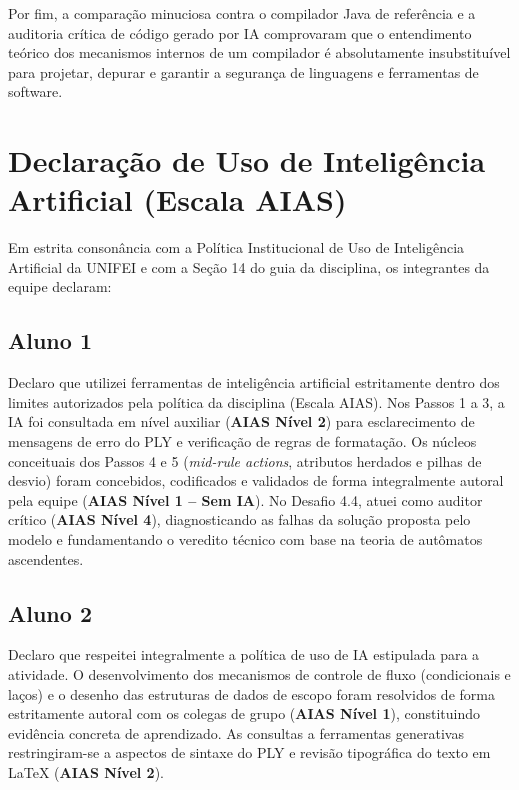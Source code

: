 \documentclass[12pt,a4paper]{article}
\begin{document}
Por fim, a comparação minuciosa contra o compilador Java de referência e a auditoria
crítica de código gerado por IA comprovaram que o entendimento teórico dos mecanismos
internos de um compilador é absolutamente insubstituível para projetar, depurar e
garantir a segurança de linguagens e ferramentas de software.

\section{Declaração de Uso de Inteligência Artificial (Escala AIAS)}

Em estrita consonância com a Política Institucional de Uso de Inteligência Artificial
da UNIFEI e com a Seção 14 do guia da disciplina, os integrantes da equipe declaram:

\subsection*{Aluno 1}
Declaro que utilizei ferramentas de inteligência artificial estritamente dentro dos
limites autorizados pela política da disciplina (Escala AIAS). Nos Passos 1 a 3, a IA
foi consultada em nível auxiliar (\textbf{AIAS Nível 2}) para esclarecimento de mensagens
de erro do PLY e verificação de regras de formatação. Os núcleos conceituais dos
Passos 4 e 5 (\textit{mid-rule actions}, atributos herdados e pilhas de desvio) foram
concebidos, codificados e validados de forma integralmente autoral pela equipe
(\textbf{AIAS Nível 1 -- Sem IA}). No Desafio 4.4, atuei como auditor crítico
(\textbf{AIAS Nível 4}), diagnosticando as falhas da solução proposta pelo modelo e
fundamentando o veredito técnico com base na teoria de autômatos ascendentes.

\subsection*{Aluno 2}
Declaro que respeitei integralmente a política de uso de IA estipulada para a atividade.
O desenvolvimento dos mecanismos de controle de fluxo (condicionais e laços) e o
desenho das estruturas de dados de escopo foram resolvidos de forma estritamente autoral
com os colegas de grupo (\textbf{AIAS Nível 1}), constituindo evidência concreta de
aprendizado. As consultas a ferramentas generativas restringiram-se a aspectos de
sintaxe do PLY e revisão tipográfica do texto em \LaTeX{} (\textbf{AIAS Nível 2}).
\end{document}
